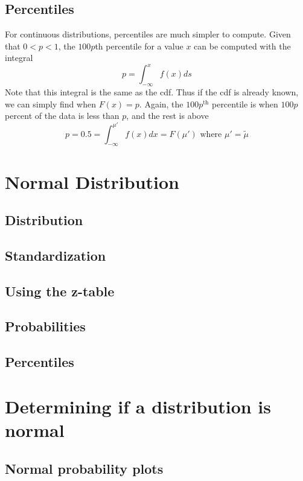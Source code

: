    \subsection{Percentiles}  %
        For continuous distributions, percentiles are much simpler to compute. Given that $0<p<1$, the $100p$th percentile for a value $x$ can be computed with the integral
        \begin{equation}
            p=\int_{-\infty}^{x} f(x)ds
        \end{equation}
        Note that this integral is the same as the cdf. Thus if the cdf is already known, we can simply find when $F(x)=p$. Again, the $100p^{\text{th}}$ percentile is when $100p$ percent of the data is less than $p$, and the rest is above\\
        \begin{equation}
            p=0.5=\int_{-\infty}^{\mu'} f(x)dx=F(\mu')\text{ where } \mu'=\tilde{\mu}
        \end{equation}

\section{Normal Distribution}  %
    \subsection{Distribution}  %
    \subsection{Standardization}  %
    \subsection{Using the z-table}  %
    \subsection{Probabilities}  %
    \subsection{Percentiles}  %

\section{Determining if a distribution is normal}  %
    \subsection{Normal probability plots}  %

